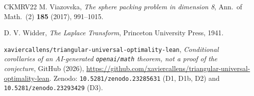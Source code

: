 \documentclass[11pt, a4paper]{article}
\theoremstyle{definition}
\theoremstyle{remark}
\begin{document}
\begin{thebibliography}{CKMRV22}
 M. Viazovska, \emph{The sphere packing problem in dimension 8}, Ann.\ of Math.\ (2) \textbf{185} (2017), 991--1015.

 D. V. Widder, \emph{The Laplace Transform}, Princeton University Press, 1941.

 \texttt{xaviercallens/triangular-universal-optimality-lean}, \emph{Conditional corollaries of an AI-generated \texttt{openai/math} theorem, not a proof of the conjecture}, GitHub (2026), \url{https://github.com/xaviercallens/triangular-universal-optimality-lean}. Zenodo: \texttt{10.5281/zenodo.23285631} (D1, D1b, D2) and \texttt{10.5281/zenodo.23293429} (D3).

\end{thebibliography}
\end{document}
